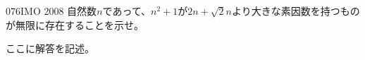 \begin{prob}{076}{}{IMO 2008}
 自然数$n$であって、$n^2+1$が$2n+\sqrt{2}n$より大きな素因数を持つものが無限に存在することを示せ。
\end{prob}

ここに解答を記述。